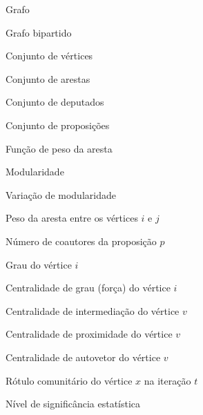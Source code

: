 \documentclass[
      12pt,
      a4paper,
      openright,
      oneside,
      chapter=TITLE,
      section=TITLE,
      english,
      french,
      spanish,
      brazilian
    ]{abntex2}
\begin{document}
        \begin{simbolos}
            \item[$G$]      Grafo
            \item[$B$]      Grafo bipartido
            \item[$V$]      Conjunto de vértices
            \item[$E$]      Conjunto de arestas
            \item[$D$]      Conjunto de deputados
            \item[$P$]      Conjunto de proposições
            \item[$w$]      Função de peso da aresta
            \item[$Q$]      Modularidade
            \item[$\Delta Q$] Variação de modularidade
            \item[$w_{ij}$] Peso da aresta entre os vértices $i$ e $j$
            \item[$n_p$]    Número de coautores da proposição $p$
            \item[$k_i$]    Grau do vértice $i$
            \item[$s_i$]    Centralidade de grau (força) do vértice $i$
            \item[$C_B(v)$] Centralidade de intermediação do vértice $v$
            \item[$C_C(v)$] Centralidade de proximidade do vértice $v$
            \item[$C_E(v)$] Centralidade de autovetor do vértice $v$
            \item[$C_x(t)$] Rótulo comunitário do vértice $x$ na iteração $t$
            \item[$\alpha$] Nível de significância estatística
        \end{simbolos}
    
        \tableofcontents*
        \newpage
    
        \textual
        \pagestyle{simple}
    
\end{document}
